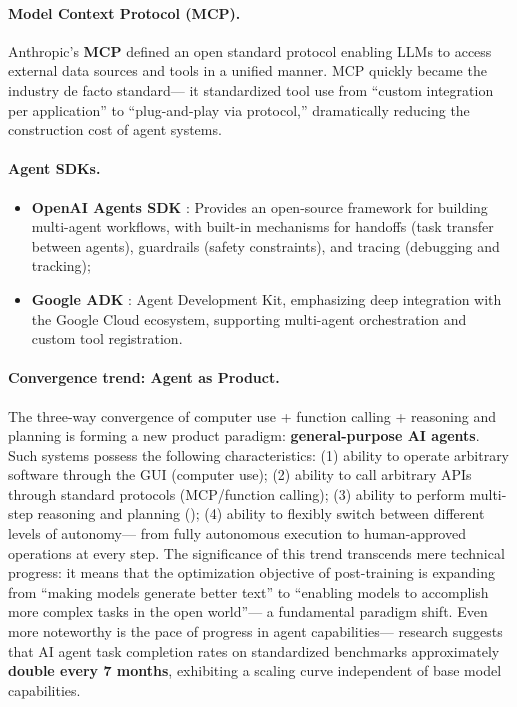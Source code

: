 \paragraph{Model Context Protocol (MCP).}
Anthropic's \textbf{MCP} \cite{anthropic2024mcp}
defined an open standard protocol
enabling LLMs to access external data sources and tools in a unified manner.
MCP quickly became the industry de facto standard---
it standardized tool use from ``custom integration per application''
to ``plug-and-play via protocol,''
dramatically reducing the construction cost of agent systems.

\paragraph{Agent SDKs.}
\begin{itemize}[leftmargin=2em]
  \item \textbf{OpenAI Agents SDK} \cite{openai2025agentssdk}:
    Provides an open-source framework for building multi-agent workflows,
    with built-in mechanisms for handoffs (task transfer between agents), guardrails (safety constraints), and tracing (debugging and tracking);
  \item \textbf{Google ADK} \cite{google2025adk}:
    Agent Development Kit, emphasizing deep integration with the Google Cloud ecosystem,
    supporting multi-agent orchestration and custom tool registration.
\end{itemize}

\paragraph{Convergence trend: Agent as Product.}
The three-way convergence of computer use + function calling + reasoning and planning is forming a new product paradigm:
\textbf{general-purpose AI agents}.
Such systems possess the following characteristics:
(1) ability to operate arbitrary software through the GUI (computer use);
(2) ability to call arbitrary APIs through standard protocols (MCP/function calling);
(3) ability to perform multi-step reasoning and planning ();
(4) ability to flexibly switch between different levels of autonomy---
from fully autonomous execution to human-approved operations at every step.
The significance of this trend transcends mere technical progress:
it means that the optimization objective of post-training is expanding from
``making models generate better text''
to ``enabling models to accomplish more complex tasks in the open world''---
a fundamental paradigm shift.
Even more noteworthy is the pace of progress in agent capabilities---
research suggests that AI agent task completion rates on standardized benchmarks
approximately \textbf{double every 7 months}, exhibiting a scaling curve independent of base model capabilities.

